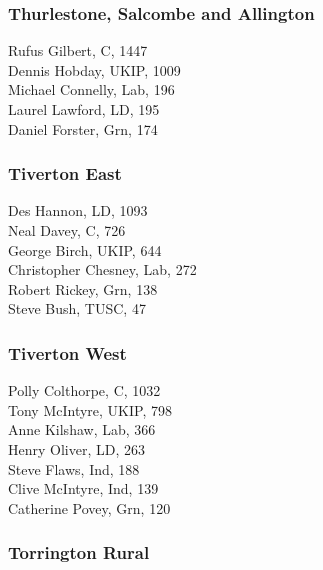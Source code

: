 \documentclass[a4paper,openany,10pt]{book}
\begin{document}
\subsubsection*{Thurlestone, Salcombe and Allington}



Rufus Gilbert, C, 1447\\
Dennis Hobday, UKIP, 1009\\
Michael Connelly, Lab, 196\\
Laurel Lawford, LD, 195\\
Daniel Forster, Grn, 174\\


\subsubsection*{Tiverton East}



Des Hannon, LD, 1093\\
Neal Davey, C, 726\\
George Birch, UKIP, 644\\
Christopher Chesney, Lab, 272\\
Robert Rickey, Grn, 138\\
Steve Bush, TUSC, 47\\


\subsubsection*{Tiverton West}



Polly Colthorpe, C, 1032\\
Tony McIntyre, UKIP, 798\\
Anne Kilshaw, Lab, 366\\
Henry Oliver, LD, 263\\
Steve Flaws, Ind, 188\\
Clive McIntyre, Ind, 139\\
Catherine Povey, Grn, 120\\


\subsubsection*{Torrington Rural}
\end{document}
